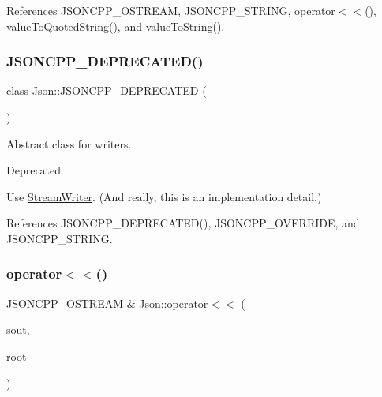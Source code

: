 References J\+S\+O\+N\+C\+P\+P\+\_\+\+O\+S\+T\+R\+E\+AM, J\+S\+O\+N\+C\+P\+P\+\_\+\+S\+T\+R\+I\+NG, operator$<$$<$(), value\+To\+Quoted\+String(), and value\+To\+String().

\mbox{\label{namespaceJson_a677dd20047c0c6e4eb16c5f1b53f703c_a677dd20047c0c6e4eb16c5f1b53f703c}} 
\subsubsection{\texorpdfstring{J\+S\+O\+N\+C\+P\+P\+\_\+\+D\+E\+P\+R\+E\+C\+A\+T\+E\+D()}{JSONCPP\_DEPRECATED()}\hspace{0.1cm}{\footnotesize\ttfamily [3/3]}}
{\footnotesize\ttfamily class Json\+::\+J\+S\+O\+N\+C\+P\+P\+\_\+\+D\+E\+P\+R\+E\+C\+A\+T\+ED (\begin{DoxyParamCaption}\item[{\char`\"{}Use \hyperlink{classJson_1_1StreamWriter}{Stream\+Writer} instead\char`\"{}}]{ }\end{DoxyParamCaption})}



Abstract class for writers. 

\begin{DoxyRefDesc}{Deprecated}
\item[\hyperlink{deprecated__deprecated000007}{Deprecated}]Use \hyperlink{classJson_1_1StreamWriter}{Stream\+Writer}. (And really, this is an implementation detail.) \end{DoxyRefDesc}


References J\+S\+O\+N\+C\+P\+P\+\_\+\+D\+E\+P\+R\+E\+C\+A\+T\+E\+D(), J\+S\+O\+N\+C\+P\+P\+\_\+\+O\+V\+E\+R\+R\+I\+DE, and J\+S\+O\+N\+C\+P\+P\+\_\+\+S\+T\+R\+I\+NG.

\mbox{\label{namespaceJson_a975d1dbca8aa7a06f38d373edcb9081c_a975d1dbca8aa7a06f38d373edcb9081c}} 
\subsubsection{\texorpdfstring{operator$<$$<$()}{operator<<()}}
{\footnotesize\ttfamily \hyperlink{json_8h_a37a25be5fca174927780caeb280094ce_a37a25be5fca174927780caeb280094ce}{J\+S\+O\+N\+C\+P\+P\+\_\+\+O\+S\+T\+R\+E\+AM} \& Json\+::operator$<$$<$ (\begin{DoxyParamCaption}\item[{\hyperlink{json_8h_a37a25be5fca174927780caeb280094ce_a37a25be5fca174927780caeb280094ce}{J\+S\+O\+N\+C\+P\+P\+\_\+\+O\+S\+T\+R\+E\+AM} \&}]{sout,  }\item[{const \hyperlink{classJson_1_1Value}{Value} \&}]{root }\end{DoxyParamCaption})}



